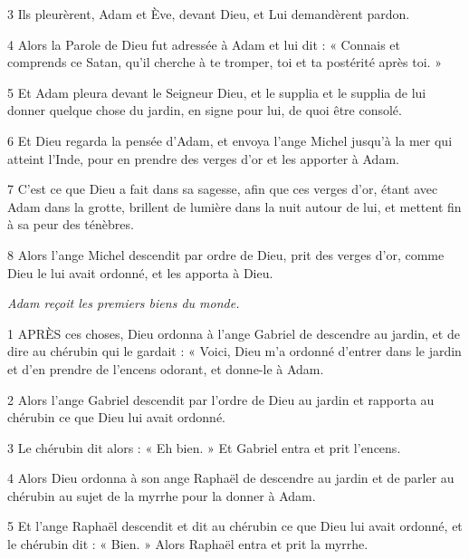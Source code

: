 \par 3 Ils pleurèrent, Adam et Ève, devant Dieu, et Lui demandèrent pardon.

\par 4 Alors la Parole de Dieu fut adressée à Adam et lui dit : « Connais et comprends ce Satan, qu'il cherche à te tromper, toi et ta postérité après toi. »

\par 5 Et Adam pleura devant le Seigneur Dieu, et le supplia et le supplia de lui donner quelque chose du jardin, en signe pour lui, de quoi être consolé.

\par 6 Et Dieu regarda la pensée d'Adam, et envoya l'ange Michel jusqu'à la mer qui atteint l'Inde, pour en prendre des verges d'or et les apporter à Adam.

\par 7 C'est ce que Dieu a fait dans sa sagesse, afin que ces verges d'or, étant avec Adam dans la grotte, brillent de lumière dans la nuit autour de lui, et mettent fin à sa peur des ténèbres.

\par 8 Alors l'ange Michel descendit par ordre de Dieu, prit des verges d'or, comme Dieu le lui avait ordonné, et les apporta à Dieu.


\par \textit{Adam reçoit les premiers biens du monde.}

\par 1 APRÈS ces choses, Dieu ordonna à l'ange Gabriel de descendre au jardin, et de dire au chérubin qui le gardait : « Voici, Dieu m'a ordonné d'entrer dans le jardin et d'en prendre de l'encens odorant, et donne-le à Adam.

\par 2 Alors l'ange Gabriel descendit par l'ordre de Dieu au jardin et rapporta au chérubin ce que Dieu lui avait ordonné.

\par 3 Le chérubin dit alors : « Eh bien. » Et Gabriel entra et prit l'encens.

\par 4 Alors Dieu ordonna à son ange Raphaël de descendre au jardin et de parler au chérubin au sujet de la myrrhe pour la donner à Adam.

\par 5 Et l'ange Raphaël descendit et dit au chérubin ce que Dieu lui avait ordonné, et le chérubin dit : « Bien. » Alors Raphaël entra et prit la myrrhe.

